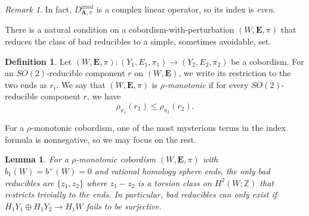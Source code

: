 \documentclass{memo-l}
\newtheorem{lemma}[theorem]{Lemma}
\theoremstyle{definition}
\newtheorem{definition}[theorem]{Definition}
\theoremstyle{remark}
\newtheorem{remark}[theorem]{Remark}
\numberwithin{section}{chapter}
\numberwithin{equation}{chapter}
\begin{document}
\begin{remark}In fact, $D^{\text{irred}}_{\mathbf{A},\pi}$ is a complex linear operator, so its index is \emph{even}.
\end{remark}

There is a natural condition on a cobordism-with-perturbation $(W,\mathbf{E},\pi)$ that reduces the class of bad reducibles to a simple, sometimes avoidable, set.

\begin{definition}Let $(W,\mathbf{E},\pi): (Y_1, E_1, \pi_1) \to (Y_2, E_2, \pi_2)$ be a cobordism. For an $SO(2)$-reducible component $r$ on $(W,\mathbf{E})$, we write its restriction to the two ends as $r_i$. We say that $(W,\mathbf{E},\pi)$ is \emph{$\rho$-monotonic} if for every $SO(2)$-reducible component $r$, we have $$\rho_{\pi_1}(r_1) \leq \rho_{\pi_2}(r_2).$$
\end{definition}

For a $\rho$-monotonic cobordism, one of the most mysterious terms in the index formula is nonnegative, so we may focus on the rest. 

\begin{lemma}For a $\rho$-monotonic cobordism $(W,\mathbf{E},\pi)$ with $b_1(W) = b^+(W) = 0$ and rational homology sphere ends, the only bad reducibles are $\{z_1, z_2\}$ where $z_1 - z_2$ is a torsion class on $H^2(W;\mathbb Z)$ that restricts trivially to the ends. In particular, bad reducibles can only exist if $H_1 Y_1 \oplus H_1 Y_2 \to H_1 W$ fails to be surjective.
\end{lemma}
\end{document}

